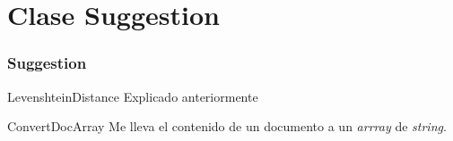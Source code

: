 
\section{Clase Suggestion}
\begin{frame}
    \frametitle{Suggestion}
    \begin{block}{LevenshteinDistance}
     Explicado anteriormente
    \end{block}
        \pause
    \begin{block}{ConvertDocArray}
     Me lleva el contenido de un documento a un
    \textit{arrray } de \textit{string}.
    \end{block}
    
    
\end{frame}